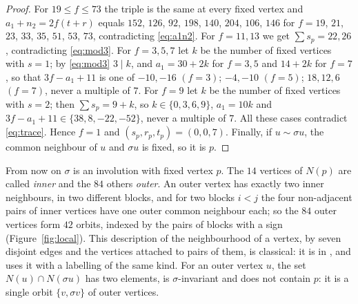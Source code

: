 \documentclass[11pt]{amsart}
\theoremstyle{definition}
\theoremstyle{remark}
\newcommand{\s}{\sigma}
\begin{document}
\begin{proof}
For $19\le f\le 73$ the triple is the same at every fixed vertex and $a_1+n_2=2f(t+r)$ equals
$152$, $126$, $92$, $198$, $140$, $204$, $106$, $146$ for $f=19$, $21$, $23$, $33$, $35$, $51$, $53$, $73$, contradicting
\eqref{eq:a1n2}. For $f=11,13$ we get $\sum s_p=22,26$, contradicting \eqref{eq:mod3}. For $f=3,5,7$ let $k$ be the number of
fixed vertices with $s=1$; by \eqref{eq:mod3} $3\mid k$, and $a_1=30+2k$ for $f=3,5$ and $14+2k$ for $f=7$, so that
$3f-a_1+11$ is one of $-10,-16$ $(f=3)$; $-4,-10$ $(f=5)$; $18,12,6$ $(f=7)$, never a multiple of $7$. For $f=9$ let $k$ be the
number of fixed vertices with $s=2$; then $\sum s_p=9+k$, so $k\in\{0,3,6,9\}$, $a_1=10k$ and
$3f-a_1+11\in\{38,8,-22,-52\}$, never a multiple of $7$. All these cases contradict \eqref{eq:trace}. Hence $f=1$ and
$(s_p,r_p,t_p)=(0,0,7)$. Finally, if $u\sim\s u$, the common neighbour of $u$ and $\s u$ is fixed, so it is $p$.
\end{proof}

From now on $\s$ is an involution with fixed vertex $p$. The $14$ vertices of $N(p)$ are called \emph{inner} and the $84$
others \emph{outer}. An outer vertex has exactly two inner neighbours, in two different blocks, and for two blocks $i<j$ the
four non-adjacent pairs of inner vertices have one outer common neighbour each; so the $84$ outer vertices form $42$ orbits,
indexed by the pairs of blocks with a sign (Figure~\ref{fig:local}). This description of the neighbourhood of a vertex,
by seven disjoint edges and the vertices attached to pairs of them, is classical: it is in \cite{W84}, and
\cite[Section~2]{CW} uses it with a labelling of the same kind. For an outer vertex $u$, the set $N(u)\cap N(\s u)$ has two elements, is
$\s$-invariant and does not contain $p$: it is a single orbit $\{v,\s v\}$ of outer vertices.
\end{document}
